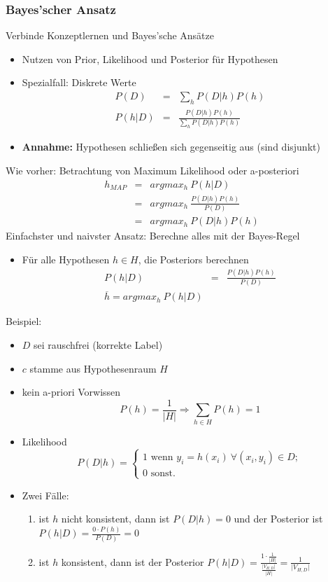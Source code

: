 	\subsubsection{Bayes'scher Ansatz}
	Verbinde Konzeptlernen und Bayes'sche Ansätze
	\begin{itemize}
		\item Nutzen von Prior, Likelihood und Posterior für Hypothesen
		\item Spezialfall: Diskrete Werte
		\begin{eqnarray*}
			P(D) &=& \sum_hP(D\vert h)P(h)\\
			P(h\vert D) &=& \frac{P(D\vert h)P(h)}{\sum_hP(D\vert h)P(h)}
		\end{eqnarray*}
		\item \textbf{Annahme:} Hypothesen schließen sich gegenseitig aus (sind disjunkt)
	\end{itemize}
	Wie vorher: Betrachtung von Maximum Likelihood oder a-posteriori
	\begin{eqnarray*}
		h_{MAP} &=& argmax_h~P(h\vert D)\\
		&=& argmax_h~\frac{P(D\vert h)P(h)}{P(D)}\\
		&=& argmax_h~P(D\vert h)P(h)
	\end{eqnarray*}
	Einfachster und naivster Ansatz: Berechne alles mit der Bayes-Regel
	\begin{itemize}
		\item Für alle Hypothesen $h\in H$, die Posteriors berechnen
		\begin{eqnarray*}
			P(h\vert D) &=& \frac{P(D\vert h)P(h)}{P(D)}\\
			\overline{h} = argmax_h~P(h\vert D)
		\end{eqnarray*}
	\end{itemize}
	Beispiel:
	\begin{itemize}
		\item $D$ sei rauschfrei (korrekte Label)
		\item $c$ stamme aus Hypothesenraum $H$
		\item kein a-priori Vorwissen
		\begin{equation*}
			P(h) = \frac{1}{\vert H\vert}\Rightarrow\sum_{h\in H} P(h)=1
		\end{equation*}
		\item Likelihood
		\begin{equation*}
			P(D\vert h) = \begin{cases}
				1 \text{ wenn } y_i=h(x_i) ~\forall (x_i,y_i)\in D;\\
				0 \text{ sonst.}
			\end{cases}
		\end{equation*}
		\item Zwei Fälle:
		\begin{enumerate}
			\item ist $h$ nicht konsistent, dann ist $P(D\vert h)=0$ und der Posterior ist $P(h\vert D) = \frac{0\cdot P(h)}{P(D)}= 0$
			\item ist $h$ konsistent, dann ist der Posterior $P(h\vert D) = \frac{1\cdot \frac{1}{\vert H\vert}}{\frac{\vert V_{H,D}\vert}{\vert H\vert}}= \frac{1}{\vert V_{H,D}\vert}$
		\end{enumerate}
	\end{itemize}
